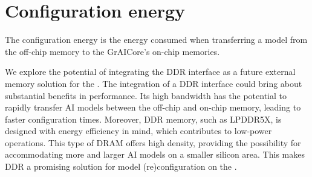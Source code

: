 \section{Configuration energy}
\label{section:configuration_energy}
The configuration energy is the energy consumed when transferring a model from the off-chip memory to the GrAICore's on-chip memories.

We explore the potential of integrating the DDR interface as a future external memory solution for the \graicore{}.
The integration of a DDR interface could bring about substantial benefits in performance.
Its high bandwidth has the potential to rapidly transfer AI models between the off-chip and on-chip memory, leading to faster configuration times.
Moreover, DDR memory, such as LPDDR5X, is designed with energy efficiency in mind, which contributes to low-power operations.
This type of DRAM offers high density, providing the possibility for accommodating more and larger AI models on a smaller silicon area.
This makes DDR a promising solution for model (re)configuration on the \graicore{}.


